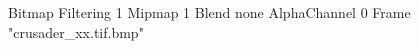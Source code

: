 {Bitmap
	{Filtering 1}
	{Mipmap 1}
	{Blend none}
	{AlphaChannel 0}
	{Frame "crusader_xx.tif.bmp"}
}
